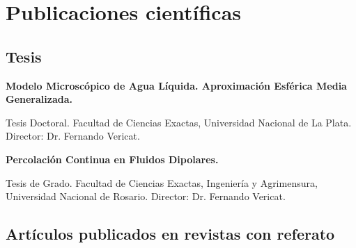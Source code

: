 \section{Publicaciones científicas}

\subsection{Tesis}
  \textbf{Modelo Microscópico de Agua Líquida. Aproximación Esférica Media Generalizada.}
 
 Tesis Doctoral. Facultad de Ciencias Exactas, Universidad Nacional de La Plata. Director: Dr. Fernando Vericat. 
 
  \textbf{Percolación Continua en Fluidos Dipolares.}
 
 Tesis de Grado. Facultad de Ciencias Exactas, Ingeniería y Agrimensura, Universidad Nacional de Rosario. Director: Dr. Fernando Vericat.

\subsection{Artículos publicados en revistas con referato}


